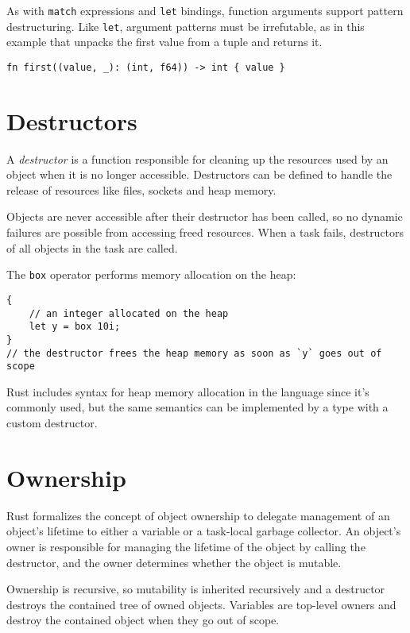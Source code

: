 \documentclass[]{article}
\begin{document}
As with \texttt{match} expressions and \texttt{let} bindings, function
arguments support pattern destructuring. Like \texttt{let}, argument
patterns must be irrefutable, as in this example that unpacks the first
value from a tuple and returns it.

\begin{verbatim}
fn first((value, _): (int, f64)) -> int { value }
\end{verbatim}

\section{Destructors}\label{destructors}

A \emph{destructor} is a function responsible for cleaning up the
resources used by an object when it is no longer accessible. Destructors
can be defined to handle the release of resources like files, sockets
and heap memory.

Objects are never accessible after their destructor has been called, so
no dynamic failures are possible from accessing freed resources. When a
task fails, destructors of all objects in the task are called.

The \texttt{box} operator performs memory allocation on the heap:

\begin{verbatim}
{
    // an integer allocated on the heap
    let y = box 10i;
}
// the destructor frees the heap memory as soon as `y` goes out of scope
\end{verbatim}

Rust includes syntax for heap memory allocation in the language since
it's commonly used, but the same semantics can be implemented by a type
with a custom destructor.

\section{Ownership}\label{ownership}

Rust formalizes the concept of object ownership to delegate management
of an object's lifetime to either a variable or a task-local garbage
collector. An object's owner is responsible for managing the lifetime of
the object by calling the destructor, and the owner determines whether
the object is mutable.

Ownership is recursive, so mutability is inherited recursively and a
destructor destroys the contained tree of owned objects. Variables are
top-level owners and destroy the contained object when they go out of
scope.
\end{document}
